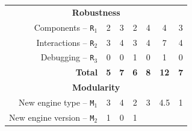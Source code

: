 \documentclass[preprint,3p,twocolumn]{elsarticle}
\begin{document}
\begin{table}
\begin{tabular}{rcccccc}
\multicolumn{7}{c}{\cellcolor[HTML]{EEEEEE}\textbf{Robustness}}\\
Components  --   \texttt{R$_1$}      & \cellcolor[HTML]{99FF99}2
                                     & \cellcolor[HTML]{99DD99}3
                                     & \cellcolor[HTML]{99FF99}2
                                     & \cellcolor[HTML]{99AA99}4  
                                     & \cellcolor[HTML]{99AA99}4 
                                     & \cellcolor[HTML]{99AA99}3 \\
Interactions -- \texttt{R$_2$}       & \cellcolor[HTML]{99FF99}3    
                                     & \cellcolor[HTML]{99DD99}4
                                     & \cellcolor[HTML]{99DD99}3      
                                     & \cellcolor[HTML]{99AA99}4  
                                     & \cellcolor[HTML]{99AA99}7      
                                     & \cellcolor[HTML]{99AA99}4 \\
Debugging --    \texttt{R$_3$}       & \cellcolor[HTML]{99AA99}0          
                                     & \cellcolor[HTML]{99FF99}0
                                     & \cellcolor[HTML]{99AA99}1
                                     & \cellcolor[HTML]{99FF99}0
                                     & \cellcolor[HTML]{99AA99}1
                                     & \cellcolor[HTML]{99FF99}0 \\
\textbf{Total}                       & \cellcolor[HTML]{99FF99}\textbf{5}
                                     & \cellcolor[HTML]{99CC99}\textbf{7}
                                     & \cellcolor[HTML]{99CC99}\textbf{6}
                                     & \cellcolor[HTML]{99BB99}\textbf{8}
                                     & \cellcolor[HTML]{99AA99}\textbf{12}
                                     & \cellcolor[HTML]{99BB99}\textbf{7} \\
\multicolumn{7}{c}{\cellcolor[HTML]{EEEEEE}\textbf{Modularity}}\\
New engine type -- \texttt{M$_1$}    & \cellcolor[HTML]{99AA99}3
                                     & \cellcolor[HTML]{99DD99}4
                                     & \cellcolor[HTML]{99FF99}2
                                     & \cellcolor[HTML]{99DD99}3
                                     & \cellcolor[HTML]{99DD99}4.5
                                     & \cellcolor[HTML]{99AA99}1 \\
New engine version -- \texttt{M$_2$} & \cellcolor[HTML]{99AA99}1
                                     & \cellcolor[HTML]{99FF99}0
                                     & \cellcolor[HTML]{99FF99}1

\end{tabular}
\end{table}
\end{document}
